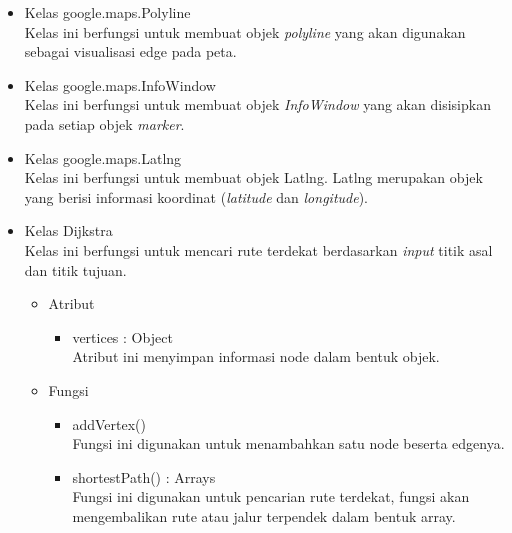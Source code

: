 \begin{itemize}
  \item Kelas google.maps.Polyline\\
  Kelas ini berfungsi untuk membuat objek \textit{polyline} yang akan digunakan
  sebagai visualisasi edge pada peta.
  
  \item Kelas google.maps.InfoWindow\\
  Kelas ini berfungsi untuk membuat objek \textit{InfoWindow} yang akan
  disisipkan pada setiap objek \textit{marker}.
  
  \item Kelas google.maps.Latlng\\
  Kelas ini berfungsi untuk membuat objek Latlng. Latlng merupakan objek yang
  berisi informasi koordinat (\textit{latitude} dan \textit{longitude}).
  
  \item Kelas Dijkstra\\
  Kelas ini berfungsi untuk mencari rute terdekat berdasarkan \textit{input}
  titik asal dan titik tujuan.
  \begin{itemize}
    \item Atribut
    \begin{itemize}
      \item vertices : Object\\
      Atribut ini menyimpan informasi node dalam bentuk objek.
    \end{itemize}
  \end{itemize}
  \begin{itemize}
    \item Fungsi
    \begin{itemize}
      \item addVertex()\\
      Fungsi ini digunakan untuk menambahkan satu node beserta edgenya.
      
      \item shortestPath() : Arrays\\
      Fungsi ini digunakan untuk pencarian rute terdekat, fungsi akan
      mengembalikan rute atau jalur terpendek dalam bentuk array.
    \end{itemize}
  \end{itemize}
  

\end{itemize}
